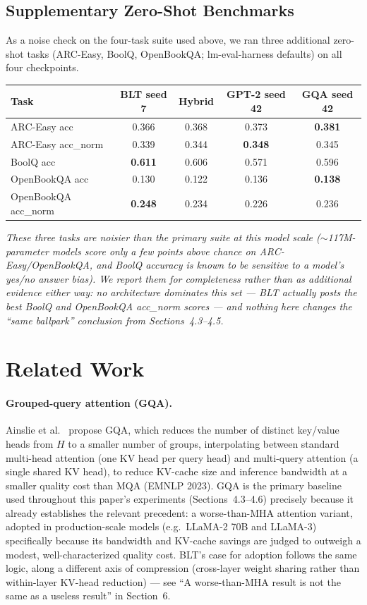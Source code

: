 \documentclass[11pt]{article}
\begin{document}
\subsection{Supplementary Zero-Shot Benchmarks}

As a noise check on the four-task suite used above, we ran three additional zero-shot tasks (ARC-Easy, BoolQ, OpenBookQA; lm-eval-harness defaults) on all four checkpoints.

\begin{center}
\begin{tabular}{lcccc}
\toprule
Task & BLT seed 7 & Hybrid & GPT-2 seed 42 & GQA seed 42 \\
\midrule
ARC-Easy acc & 0.366 & 0.368 & 0.373 & \textbf{0.381} \\
ARC-Easy acc\_norm & 0.339 & 0.344 & \textbf{0.348} & 0.345 \\
BoolQ acc & \textbf{0.611} & 0.606 & 0.571 & 0.596 \\
OpenBookQA acc & 0.130 & 0.122 & 0.136 & \textbf{0.138} \\
OpenBookQA acc\_norm & \textbf{0.248} & 0.234 & 0.226 & 0.236 \\
\bottomrule
\end{tabular}
\end{center}

\emph{These three tasks are noisier than the primary suite at this model scale ($\sim$117M-parameter models score only a few points above chance on ARC-Easy/OpenBookQA, and BoolQ accuracy is known to be sensitive to a model's yes/no answer bias). We report them for completeness rather than as additional evidence either way: no architecture dominates this set --- BLT actually posts the best BoolQ and OpenBookQA acc\_norm scores --- and nothing here changes the ``same ballpark'' conclusion from Sections~4.3--4.5.}

\section{Related Work}

\paragraph{Grouped-query attention (GQA).} Ainslie et al.~\cite{ainslie2023gqa} propose GQA, which reduces the number of distinct key/value heads from $H$ to a smaller number of groups, interpolating between standard multi-head attention (one KV head per query head) and multi-query attention (a single shared KV head), to reduce KV-cache size and inference bandwidth at a smaller quality cost than MQA (EMNLP 2023). GQA is the primary baseline used throughout this paper's experiments (Sections~4.3--4.6) precisely because it already establishes the relevant precedent: a worse-than-MHA attention variant, adopted in production-scale models (e.g.\ LLaMA-2 70B and LLaMA-3) specifically because its bandwidth and KV-cache savings are judged to outweigh a modest, well-characterized quality cost. BLT's case for adoption follows the same logic, along a different axis of compression (cross-layer weight sharing rather than within-layer KV-head reduction) --- see ``A worse-than-MHA result is not the same as a useless result'' in Section~6.
\end{document}
